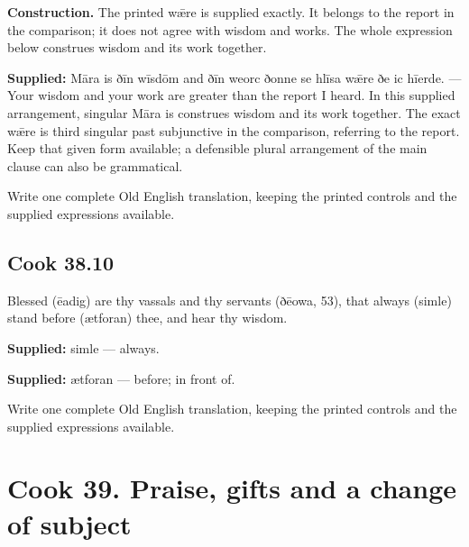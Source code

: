 \textbf{Construction.} The printed wǣre is supplied exactly. It belongs to the report in the comparison; it does not agree with wisdom and works. The whole expression below construes wisdom and its work together.

\textbf{Supplied:} Māra is ðīn wīsdōm and ðīn weorc ðonne se hlīsa wǣre ðe ic hīerde. — Your wisdom and your work are greater than the report I heard. In this supplied arrangement, singular Māra is construes wisdom and its work together. The exact wǣre is third singular past subjunctive in the comparison, referring to the report. Keep that given form available; a defensible plural arrangement of the main clause can also be grammatical.

Write one complete Old English translation, keeping the printed controls and the supplied expressions available.

\par\begin{minipage}{\linewidth}\raggedright
\subsection*{Cook 38.10}

Blessed (ēadig) are thy vassals and thy servants (ðēowa, 53), that always (simle) stand before (ætforan) thee, and hear thy wisdom.

\textbf{Supplied:} simle — always.

\textbf{Supplied:} ætforan — before; in front of.

Write one complete Old English translation, keeping the printed controls and the supplied expressions available.

\end{minipage}\par\addvspace{4pt}

\section*{Cook 39. Praise, gifts and a change of subject}

